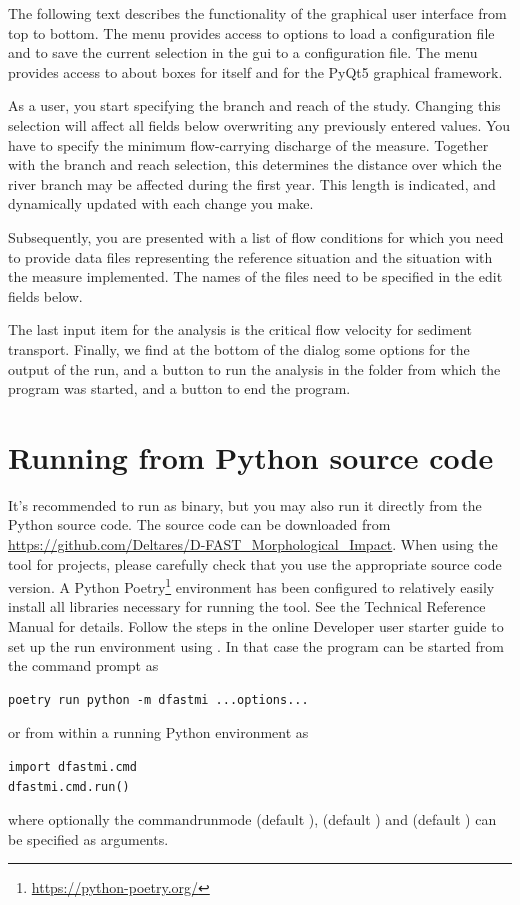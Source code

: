 The following text describes the functionality of the graphical user interface from top to bottom.
The  menu provides access to options to load a configuration file and to save the current selection in the gui to a configuration file.
The  menu provides access to about boxes for \dfastmi itself and for the PyQt5 graphical framework.

As a user, you start specifying the branch and reach of the study.
Changing this selection will affect all fields below overwriting any previously entered values.
You have to specify the minimum flow-carrying discharge of the measure.
Together with the branch and reach selection, this determines the distance over which the river branch may be affected during the first year.
This length  is indicated, and dynamically updated with each change you make.

Subsequently, you are presented with a list of flow conditions for which you need to provide data files representing the reference situation and the situation with the measure implemented.
The names of the files need to be specified in the edit fields below.

The last input item for the analysis is the critical flow velocity  for sediment transport.
Finally, we find at the bottom of the dialog some options for the output of the \dfastmi run, and a button to run the analysis in the folder from which the program was started, and a button to end the program.

\section{Running from Python source code}
It's recommended to run \dfastmi as binary, but you may also run it directly from the Python source code.
The source code can be downloaded from \url{https://github.com/Deltares/D-FAST_Morphological_Impact}.
When using the tool for projects, please carefully check that you use the appropriate source code version.
A Python Poetry\footnote{\url{https://python-poetry.org/}} environment has been configured to relatively easily install all libraries necessary for running the tool.
See the \dfastmi Technical Reference Manual for details.
Follow the steps in the online Developer user starter guide to set up the run environment using .
In that case the program can be started from the command prompt as

\begin{Verbatim}
poetry run python -m dfastmi ...options...
\end{Verbatim}

or from within a running Python environment as

\begin{Verbatim}
import dfastmi.cmd
dfastmi.cmd.run()
\end{Verbatim}

where optionally the command{runmode} (default ),  (default ) and  (default ) can be specified as arguments.